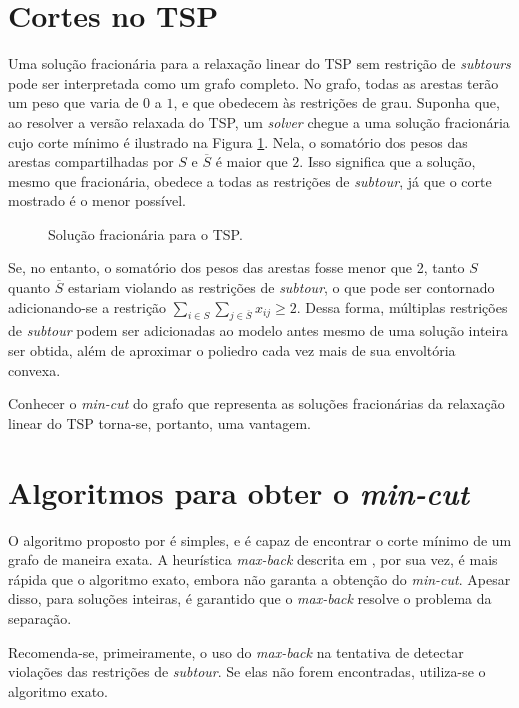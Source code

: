 \section{Cortes no TSP}
Uma solução fracionária para a relaxação linear do TSP sem restrição de \textit{subtours} pode ser interpretada como um grafo completo. No grafo, todas as arestas terão um peso que varia de \(0\) a \(1\), e que obedecem às restrições de grau.
Suponha que, ao resolver a versão relaxada do TSP,  um \textit{solver} chegue a uma solução fracionária cujo corte mínimo é ilustrado na Figura \ref{fig:solucaoFrac}. Nela, o somatório dos pesos das arestas compartilhadas por \(S\) e \(\overline{S}\) é maior que \(2\). Isso significa que a solução, mesmo que fracionária, obedece a todas as restrições de \textit{subtour}, já que o corte mostrado é o menor possível. 

\begin{figure}[h]
    \caption{Solução fracionária para o TSP.}
    \label{fig:solucaoFrac}
\end{figure}

Se, no entanto, o somatório dos pesos das arestas fosse menor que 2, tanto \(S\) quanto \(\overline{S}\) estariam violando as restrições de \textit{subtour}, o que pode ser contornado adicionando-se a restrição \(\sum_{i \in S}\sum_{j \in \overline{S}}x_{ij} \geq 2\). Dessa forma, múltiplas restrições de \textit{subtour} podem ser adicionadas ao modelo antes mesmo de uma solução inteira ser obtida, além de aproximar o poliedro cada vez mais de sua envoltória convexa.

Conhecer o \textit{min-cut} do grafo que representa as soluções fracionárias da relaxação linear do TSP torna-se, portanto, uma vantagem.

\section{Algoritmos para obter o \textit{min-cut}}
O algoritmo proposto por \cite{Stoer:1997:SMA:263867.263872} é simples, e é capaz de encontrar o corte mínimo de um grafo de maneira exata. A heurística \textit{max-back} descrita em \cite{denisnaddef}, por sua vez, é mais rápida que o algoritmo exato, embora não garanta a obtenção do \textit{min-cut}. Apesar disso, para soluções inteiras, é garantido que o \textit{max-back} resolve o problema da separação.

Recomenda-se, primeiramente, o uso do \textit{max-back} na tentativa de detectar violações das restrições de \textit{subtour}. Se elas não forem encontradas, utiliza-se o algoritmo exato.

